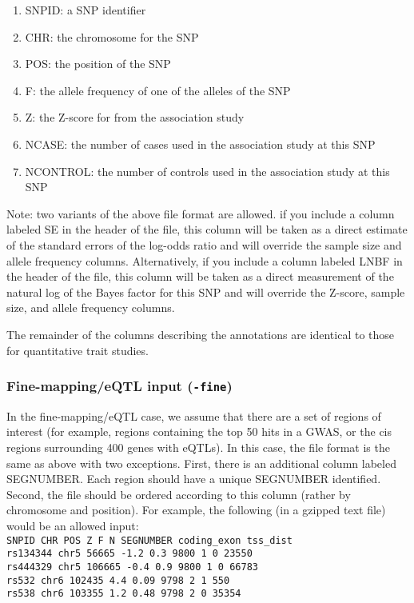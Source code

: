 \documentclass[11pt,titlepage]{article}
\begin{document}
\begin{enumerate}
\item SNPID: a SNP identifier
\item CHR: the chromosome for the SNP
\item POS: the position of the SNP
\item F: the allele frequency of one of the alleles of the SNP
\item Z: the Z-score for from the association study
\item NCASE: the number of cases used in the association study at this SNP
\item NCONTROL: the number of controls used in the association study at this SNP
\end{enumerate}

Note: two variants of the above file format are allowed. if you include a column labeled SE in the header of the file, this column will be taken as a direct estimate of the standard errors of the log-odds ratio and will override the sample size and allele frequency columns. Alternatively, if you include a column labeled LNBF in the header of the file, this column will be taken as a direct measurement of the natural log of the Bayes factor for this SNP and will override the Z-score, sample size, and allele frequency columns.

The remainder of the columns describing the annotations are identical to those for quantitative trait studies. 

\subsubsection{Fine-mapping/eQTL input (\texttt{-fine})} \label{finemap}
In the fine-mapping/eQTL case, we assume that there are a set of regions of interest (for example, regions containing the top 50 hits in a GWAS, or the cis regions surrounding 400 genes with eQTLs). In this case, the file format is the same as above with two exceptions. First, there is an additional column labeled SEGNUMBER. Each region should have a unique SEGNUMBER identified. Second, the file should be ordered according to this column (rather by chromosome and position). For example, the following (in a gzipped text file) would be an allowed input:
\\

\noindent \texttt{SNPID CHR POS Z F N SEGNUMBER coding\_exon tss\_dist}\\
\texttt{rs134344 chr5 56665 -1.2 0.3 9800 1 0 23550}\\
\texttt{rs444329 chr5 106665 -0.4 0.9 9800  1 0 66783}\\
\texttt{rs532 chr6 102435 4.4 0.09 9798 2 1 550}\\
\texttt{rs538 chr6 103355 1.2 0.48 9798 2 0 35354}
\end{document}
